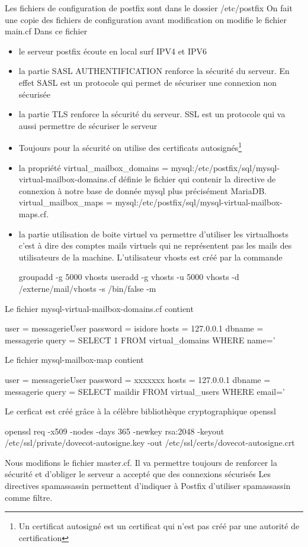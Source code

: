 \documentclass[a4paper,12pt,french]{report} %
\begin{document}
Les fichiers de configuration de postfix sont dans le dossier /etc/postfix
On fait une copie des fichiers de configuration avant modification
on modifie le fichier main.cf
Dans ce fichier 
\begin{itemize}
	\item le serveur postfix écoute en local surf IPV4 et IPV6
	\item la partie SASL AUTHENTIFICATION renforce la sécurité du serveur. En effet SASL est un protocole qui permet de sécuriser une connexion non sécurisée
	\item la partie TLS renforce la sécurité du serveur. SSL est un protocole qui va aussi permettre de sécuriser le serveur
	\item Toujours pour la sécurité on utilise des certificats autosignés\footnote{Un certificat autosigné est un certificat qui n'est pas créé par une autorité de certification} 
	\item la propriété virtual\_mailbox\_domains = mysql:/etc/postfix/sql/mysql-virtual-mailbox-domains.cf définie le fichier qui contenir la directive de connexion à notre base de donnée mysql plus précisément MariaDB. virtual\_mailbox\_maps = mysql:/etc/postfix/sql/mysql-virtual-mailbox-maps.cf.	
	\item la partie utilisation de boite virtuel va permettre d'utiliser les virtualhosts c'est à dire des comptes mails virtuels qui ne représentent pas les mails des utilisateurs de la machine. L'utilisateur vhosts est créé par la commande
	\begin{exempleConsole}
	groupadd -g 5000 vhosts 
	useradd -g vhosts -u 5000 vhosts -d /externe/mail/vhosts -s /bin/false -m
	\end{exempleConsole}
\end{itemize}
Le fichier mysql-virtual-mailbox-domains.cf contient 
\begin{exempleConsole}
user = messagerieUser
password = isidore
hosts = 127.0.0.1
dbname = messagerie
query = SELECT 1 FROM virtual_domains WHERE name='%
\end{exempleConsole}
Le fichier mysql-mailbox-map contient 
\begin{exempleConsole}
user = messagerieUser
password = xxxxxxx
hosts = 127.0.0.1
dbname = messagerie
query = SELECT maildir FROM virtual_users WHERE email='%
\end{exempleConsole}
Le cerficat est créé grâce à la célèbre bibliothèque  cryptographique openssl
\begin{exempleConsole}
openssl req -x509 -nodes -days 365 -newkey rsa:2048 -keyout /etc/ssl/private/dovecot-autosigne.key -out /etc/ssl/certs/dovecot-autosigne.crt
\end{exempleConsole}
Nous modifions le fichier master.cf. Il va permettre toujours de renforcer la sécurité et d'obliger le serveur a accepté que des connexions sécurisés
Les directives spamassassin permettent d'indiquer à Postfix d'utiliser spamassassin comme filtre.
\end{document}
